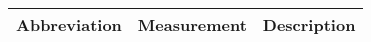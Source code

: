 \begin{tabular}{lll}
\hline
\textbf{Abbreviation} & \textbf{Measurement} & \textbf{Description}\\
\hline
\hline

\end{tabular}